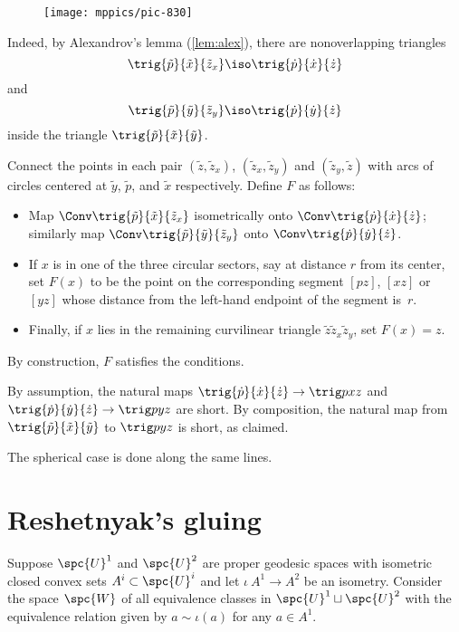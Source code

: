 \begin{wrapfigure}{r}{50mm}
\vskip-4mm
\centering
\texttt{[image: mppics/pic-830]}
\vskip0mm
\end{wrapfigure}

Indeed, by Alexandrov's lemma (\ref{lem:alex}), 
there are nonoverlapping triangles 
\[\trig{\tilde p}{\tilde x}{\tilde z_x}\iso\trig {\dot p}{\dot x}{\dot z}\] 
and 
\[\trig{\tilde p}{\tilde y}{\tilde z_y}\iso\trig {\dot p}{\dot y}{\dot z}\]
inside the  triangle $\trig{\tilde p}{\tilde x}{\tilde y}$.

Connect  the points in each pair
$(\tilde z,\tilde z_x)$, 
$(\tilde z_x,\tilde z_y)$ 
and $(\tilde z_y,\tilde z)$ 
with arcs of circles centered at 
$\tilde y$, $\tilde p$, and $\tilde x$ respectively. 
Define $F$ as follows:
\begin{itemize}

\item Map  $\Conv\trig{\tilde p}{\tilde x}{\tilde z_x}$ isometrically onto  $\Conv\trig {\dot p}{\dot x}{\dot z}$;
similarly map $\Conv \trig{\tilde p}{\tilde y}{\tilde z_y}$ onto $\Conv \trig {\dot p}{\dot y}{\dot z}$.

\item If $x$ is in one of the three circular sectors, say at distance $r$ from its center, set $F(x)$ to be the point on the corresponding segment 
$[p z]$, 
$[x z]$ 
or $[y z]$ whose distance from the left-hand endpoint of the segment is~$r$.

\item Finally, if $x$ lies in the remaining curvilinear triangle $\tilde z \tilde z_x \tilde z_y$, 
set $F(x) = z$. 
\end{itemize}
By construction, $F$ satisfies the conditions.

By assumption, the natural maps $\trig {\dot p} {\dot x} {\dot z}\to\trig p x z$ and $\trig {\dot p} {\dot y} {\dot z}\to\trig p y z$ are short.  
By composition,  the natural map from $\trig{\tilde  p}{\tilde  x}{\tilde  y}$ to $\trig p y z$ is short, as claimed.

The spherical case is done along the same lines.
\qeds

\section{Reshetnyak's gluing}\label{sec:cba-gluing}

Suppose 
$\spc{U}^1$ and $\spc{U}^2$ are proper geodesic spaces 
with isometric closed convex sets $A^i\subset\spc{U}^i$ and let $\iota\:A^1\to A^2$ be an isometry.
Consider the space $\spc{W}$ of all equivalence classes in $\spc{U}^1\sqcup\spc{U}^2$ with the equivalence relation given by $a\sim\iota(a)$ for any $a\in A^1$. %

